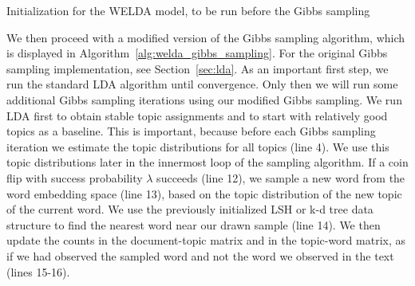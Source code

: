 \documentclass[
        a4paper,
        titlepage,
        twoside,
        parskip
        ]{scrbook}
\theoremstyle{break}
\begin{document}


\begin{algorithm}
  \caption{Initialization for the WELDA model, to be run before the Gibbs sampling}
  \label{alg:welda_init}
  \begin{algorithmic}[1]
    \EndFor
    \EndProcedure
  \end{algorithmic}
\end{algorithm}

We then proceed with a modified version of the Gibbs sampling algorithm, which is displayed in Algorithm~\ref{alg:welda_gibbs_sampling}.
For the original Gibbs sampling implementation, see Section~\ref{sec:lda}.
As an important first step, we run the standard LDA algorithm until convergence.
Only then we will run some additional Gibbs sampling iterations using our modified Gibbs sampling.
We run LDA first to obtain stable topic assignments and to start with relatively good topics as a baseline.
This is important, because before each Gibbs sampling iteration we estimate the topic distributions for all topics (line 4).
We use this topic distributions later in the innermost loop of the sampling algorithm.
If a coin flip with success probability $\lambda$ succeeds (line 12), we sample a new word from the word embedding space (line 13), based on the topic distribution of the new topic of the current word.
We use the previously initialized LSH or k-d tree data structure to find the nearest word near our drawn sample (line 14).
We then update the counts in the document-topic matrix and in the topic-word matrix, as if we had observed the sampled word and not the word we observed in the text (lines 15-16).
\end{document}
